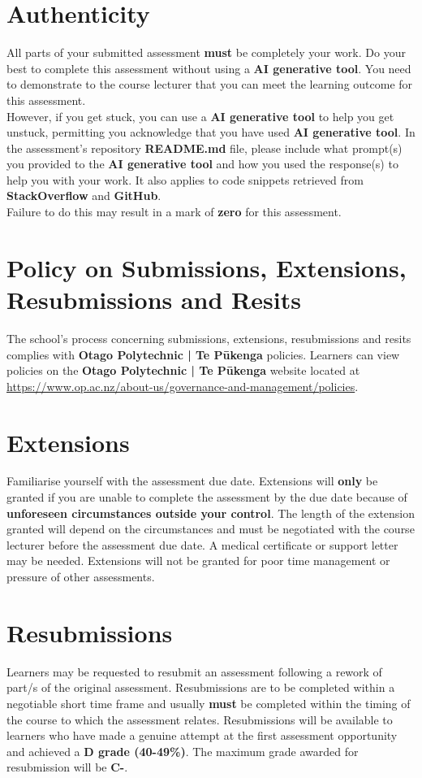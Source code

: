 \documentclass{article}
\begin{document}
\section*{Authenticity}
All parts of your submitted assessment \textbf{must} be completely your work. Do your best to complete this assessment without using a \textbf{AI generative tool}. You need to demonstrate to the course lecturer that you can meet the learning outcome for this assessment. \\
 
 However, if you get stuck, you can use a \textbf{AI generative tool} to help you get unstuck, permitting you acknowledge that you have used \textbf{AI generative tool}. In the assessment's repository \textbf{README.md} file, please include what prompt(s) you provided to the \textbf{AI generative tool} and how you used the response(s) to help you with your work. It also applies to code snippets retrieved from \textbf{StackOverflow} and \textbf{GitHub}. \\
 
 Failure to do this may result in a mark of \textbf{zero} for this assessment.

\section*{Policy on Submissions, Extensions, Resubmissions and Resits}
The school's process concerning submissions, extensions, resubmissions and resits complies with \textbf{Otago Polytechnic | Te Pūkenga} policies. Learners can view policies on the \textbf{Otago Polytechnic | Te Pūkenga} website located at \href{https://www.op.ac.nz/about-us/governance-and-management/policies}{https://www.op.ac.nz/about-us/governance-and-management/policies}. 

\section*{Extensions}
Familiarise yourself with the assessment due date. Extensions will \textbf{only} be granted if you are unable to complete the assessment by the due date because of \textbf{unforeseen circumstances outside your control}. The length of the extension granted will depend on the circumstances and must be negotiated with the course lecturer before the assessment due date. A medical certificate or support letter may be needed. Extensions will not be granted for poor time management or pressure of other assessments.

\section*{Resubmissions}
Learners may be requested to resubmit an assessment following a rework of part/s of the original assessment. Resubmissions are to be completed within a negotiable short time frame and usually \textbf{must} be completed within the timing of the course to which the assessment relates. Resubmissions will be available to learners who have made a genuine attempt at the first assessment opportunity and achieved a \textbf{D grade (40-49\%)}. The maximum grade awarded for resubmission will be \textbf{C-}.
\end{document}

